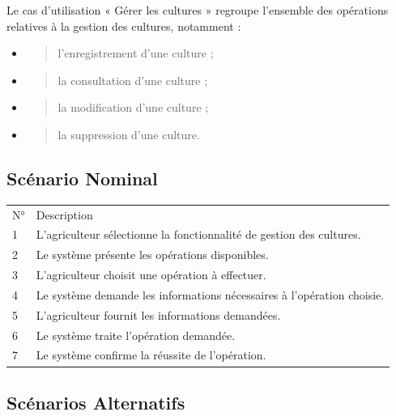 \documentclass[
]{book}
\begin{document}
Le cas d'utilisation « Gérer les cultures » regroupe l'ensemble des
opérations relatives à la gestion des cultures, notamment :

\begin{itemize}
\item
  \begin{quote}
  l'enregistrement d'une culture ;
  \end{quote}
\item
  \begin{quote}
  la consultation d'une culture ;
  \end{quote}
\item
  \begin{quote}
  la modification d'une culture ;
  \end{quote}
\item
  \begin{quote}
  la suppression d'une culture.
  \end{quote}
\end{itemize}

\hypertarget{scuxe9nario-nominal-1}{%
\subsection{Scénario Nominal}\label{scuxe9nario-nominal-1}}

\begin{longtable}[]{@{}ll@{}}
\toprule
\endhead
N° & Description \\
1 & L'agriculteur sélectionne la fonctionnalité de gestion des
cultures. \\
2 & Le système présente les opérations disponibles. \\
3 & L'agriculteur choisit une opération à effectuer. \\
4 & Le système demande les informations nécessaires à l'opération
choisie. \\
5 & L'agriculteur fournit les informations demandées. \\
6 & Le système traite l'opération demandée. \\
7 & Le système confirme la réussite de l'opération. \\
\bottomrule
\end{longtable}

\hypertarget{scuxe9narios-alternatifs-1}{%
\subsection{Scénarios Alternatifs}\label{scuxe9narios-alternatifs-1}}
\end{document}
